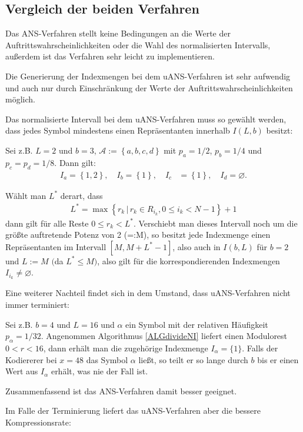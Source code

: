 \documentclass[a4paper,12pt]{article}
\newcommand{\A}{\mathcal A}
\newcounter{Algorithmus}
\begin{document}
\subsection{Vergleich der beiden Verfahren}
Das ANS-Verfahren stellt keine Bedingungen an die Werte der Auftrittswahrscheinlichkeiten oder die Wahl des normalisierten Intervalls, außerdem ist das Verfahren sehr leicht zu implementieren.
\par
Die Generierung der Indexmengen bei dem uANS-Verfahren ist sehr aufwendig und auch nur durch Einschränkung der Werte der Auftrittswahrscheinlichkeiten möglich.
\par
Das normalisierte Intervall bei dem uANS-Verfahren muss so gewählt werden, dass jedes Symbol mindestens einen Repräsentanten innerhalb  
$I(L,b)$ besitzt:
\par
Sei z.B. $L=2$ und $b=3$, $\A:=\left\{a, b, c, d\right\}$ mit $p_{a}=1/2$, $p_{b}=1/4$ und $p_{c}=p_{d}=1/8$. 
Dann gilt:
\begin{align*}
I_{a}=\left\{1,2\right\},\quad  I_{b}=\left\{1\right\},\quad I_{c}&=\left\{1\right\},\quad I_{d}=\varnothing.
\end{align*}
\par
Wählt man $L^{*}$ derart, dass 
\begin{align*}
L^{*} = \max \left\{r_{k}\,|\,r_{k}\in R_{i_{k}}, 0\leq i_{k} < N-1\right\} +1
\end{align*} 
dann gilt für alle Reste $0 \leq r_{k} < L^{*}$. Verschiebt man dieses Intervall noch um die größte auftretende Potenz von 2 (=:M), so besitzt jede Indexmenge einen Repräsentanten im Intervall $[M,M + L^{*}-1]$, also auch in $I(b,L)$ für $b=2$ und $L:=M$ $($da $L^{*} \leq M)$, also gilt für die korrespondierenden Indexmengen $I_{i_{k}} \neq \varnothing$.
\par
Eine weiterer Nachteil findet sich in dem Umstand, dass uANS-Verfahren nicht immer terminiert:
\par
Sei z.B. $b=4$ und $L=16$ und $\alpha$ ein Symbol mit der relativen Häufigkeit $p_{\alpha}=1/32$. Angenommen Algorithmus \ref{ALGdivideNI} liefert einen Modulorest $0 < r < 16$, dann erhält man die zugehörige Indexmenge $I_{\alpha}=\{1\}$. Falls der Kodiererer bei  $x=48$ das Symbol $\alpha$ ließt, so teilt er so lange durch $b$ bis er einen Wert aus $I_{\alpha}$ erhält, was nie der Fall ist.
\par
Zusammenfassend ist das ANS-Verfahren damit besser geeignet. 
\par
Im Falle der Terminierung liefert das uANS-Verfahren  aber die bessere Kompressionsrate:
\end{document}
